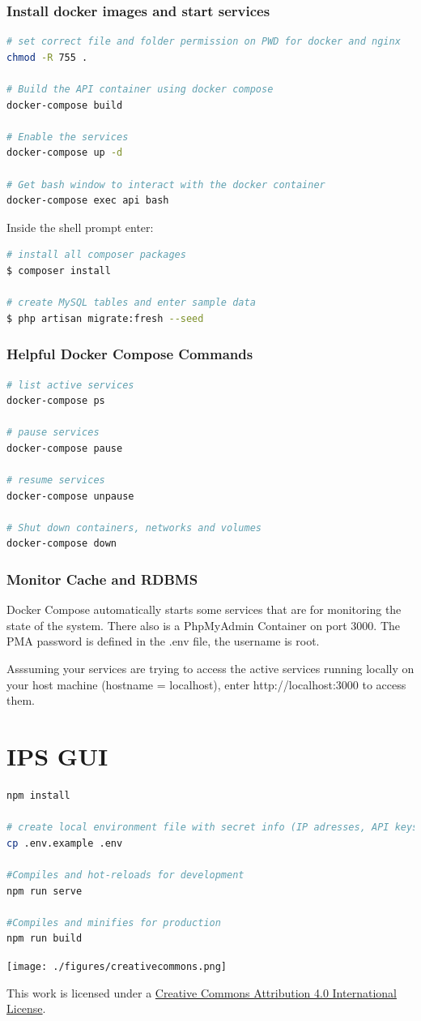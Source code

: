 \documentclass[a4paper, oneside]{ipsreport}
\begin{document}
\subsubsection*{Install docker images and start services}
\begin{lstlisting}[language=bash]
# set correct file and folder permission on PWD for docker and nginx
chmod -R 755 .

# Build the API container using docker compose
docker-compose build

# Enable the services
docker-compose up -d

# Get bash window to interact with the docker container
docker-compose exec api bash
\end{lstlisting}

Inside the shell prompt enter:

\begin{lstlisting}[language=bash]
# install all composer packages
$ composer install

# create MySQL tables and enter sample data
$ php artisan migrate:fresh --seed
\end{lstlisting}

\subsubsection*{Helpful Docker Compose Commands}
\begin{lstlisting}[language=bash]
# list active services
docker-compose ps

# pause services
docker-compose pause

# resume services
docker-compose unpause

# Shut down containers, networks and volumes
docker-compose down
\end{lstlisting}

\subsubsection*{Monitor Cache and RDBMS}
Docker Compose automatically starts some services that are for monitoring the state of the system. There also is a PhpMyAdmin Container on port 3000. The PMA password is defined in the .env file, the username is root.

Asssuming your services are trying to access the active services running locally on your host machine (hostname = localhost), enter http://localhost:3000 to access them.

\section{IPS GUI}
\label{installationguide:ipsgui}
\begin{lstlisting}[language=bash]
npm install

# create local environment file with secret info (IP adresses, API keys etc.), edit after copying!
cp .env.example .env

#Compiles and hot-reloads for development
npm run serve

#Compiles and minifies for production
npm run build

\end{lstlisting}

\texttt{[image: ./figures/creativecommons.png]}

This work is licensed under a \href{http://creativecommons.org/licenses/by/4.0/}{Creative Commons Attribution 4.0 International License}.
\end{document}
